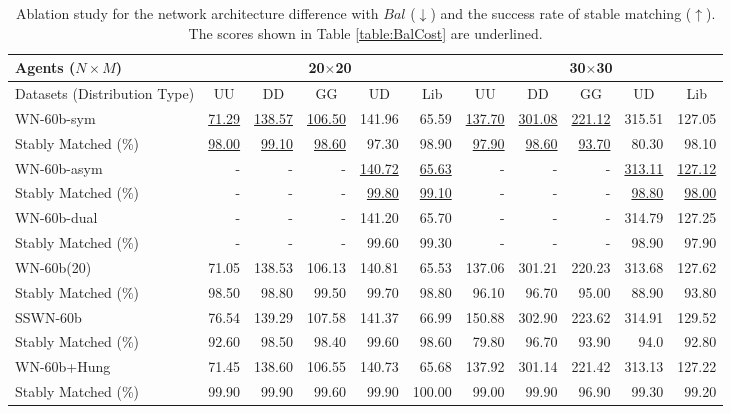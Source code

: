 \begin{table}[th!]
\setul{1pt}{.4pt}
\centering
  {\small

\begin{tabular}{lrrrrr|rrrrr}
\toprule
Agents ($N\times M$) & \multicolumn{5}{c|}{20$\times$20}  & \multicolumn{5}{c}{30$\times$30}  \\ \midrule
Datasets (Distribution Type) & \multicolumn{1}{c}{UU}    & \multicolumn{1}{c}{DD}    & \multicolumn{1}{c}{GG}    & \multicolumn{1}{c}{UD}     & \multicolumn{1}{c}{Lib}    & \multicolumn{1}{|c}{UU}    & \multicolumn{1}{c}{DD}    & \multicolumn{1}{c}{GG}    & \multicolumn{1}{c}{UD}     & \multicolumn{1}{c}{Lib} \\ \midrule
WN-60b-sym              & \ul{71.29} & \ul{138.57} & \ul{106.50} & 141.96 & 65.59 & \ul{137.70} & \ul{301.08} & \ul{221.12} & 315.51 & 127.05 \\
Stably Matched (\%)     & \ul{98.00} & \ul{99.10}  & \ul{98.60}  & 97.30  & 98.90 & \ul{97.90}  & \ul{98.60}  & \ul{93.70}  & 80.30  & 98.10 \\ \midrule
WN-60b-asym          & -& -& -& \ul{140.72} & \ul{65.63} & -& -& -& \ul{313.11} & \ul{127.12} \\
Stably Matched (\%)  & -& -& -& \ul{99.80} & \ul{99.10} & -& -& -& \ul{98.80} & \ul{98.00}\\ \midrule
WN-60b-dual          & -& -& -& 141.20 & 65.70 & - & - & - & 314.79 & 127.25 \\
Stably Matched (\%)  & -& -& -& 99.60 & 99.30 & - & - & - & 98.90 & 97.90 \\ \midrule
WN-60b(20)          & 71.05 & 138.53 & 106.13 & 140.81 & 65.53 & 137.06 & 301.21 & 220.23 & 313.68 & 127.62 \\
Stably Matched (\%)  & 98.50 & 98.80 & 99.50 & 99.70  & 98.80 & 96.10 & 96.70 & 95.00 & 88.90 & 93.80 \\ \midrule
SSWN-60b             & 76.54 & 139.29 & 107.58 & 141.37 & 66.99 & 150.88 & 302.90 & 223.62 & 314.91 & 129.52 \\
Stably Matched (\%)  & 92.60 & 98.50 & 98.40 &  99.60 & 98.60 & 79.80 & 96.70 & 93.90 & 94.0 & 92.80 \\ \midrule \midrule
WN-60b+Hung & 71.45 & 138.60 & 106.55 & 140.73 & 65.68 & 137.92 & 301.14 & 221.42 & 313.13 & 127.22 \\ 
Stably Matched (\%)  & 99.90 & 99.90 & 99.60 & 99.90 & 100.00 & 99.00 & 99.90 & 96.90 & 99.30 & 99.20 \\ \bottomrule
\end{tabular}
}
\caption{Ablation study for the network architecture difference with $Bal$ ($\downarrow$) and the success rate of stable matching ($\uparrow$). The scores shown in Table \ref{table:BalCost} are underlined.}
\end{table}


